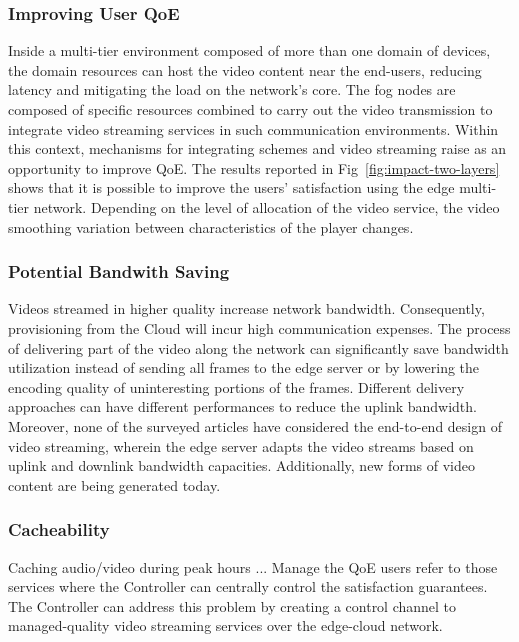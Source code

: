 \subsubsection{Improving User QoE}

Inside a multi-tier environment composed of more than one domain of devices, the domain resources can host the video content near the end-users, reducing latency and mitigating the load on the network's core. The fog nodes are composed of specific resources combined to carry out the video transmission to integrate video streaming services in such communication environments. Within this context, mechanisms for integrating schemes and video streaming raise as an opportunity to improve QoE.%
The results reported in Fig~\ref{fig:impact-two-layers} shows that it is possible to improve the users' satisfaction using the edge multi-tier network. Depending on the level of allocation of the video service, the video smoothing variation between characteristics of the player changes.


\subsubsection{Potential Bandwith Saving}

Videos streamed in higher quality increase network bandwidth. Consequently, provisioning from the Cloud will incur high communication expenses. 
The process of delivering part of the video along the network can significantly save bandwidth utilization instead of sending all frames to the edge server or by lowering the encoding quality of uninteresting portions of the frames. Different delivery approaches can have different performances to reduce the uplink bandwidth. Moreover, none of the surveyed articles have considered the end-to-end design of video streaming, wherein the edge server adapts the video streams based on uplink and downlink bandwidth capacities. Additionally, new forms of video content are being generated today.


\subsubsection{Cacheability}

Caching audio/video during peak hours ...
Manage the QoE users refer to those services where the Controller can centrally control the satisfaction guarantees. The Controller can address this problem by creating a control channel to managed-quality video streaming services over the edge-cloud network.
